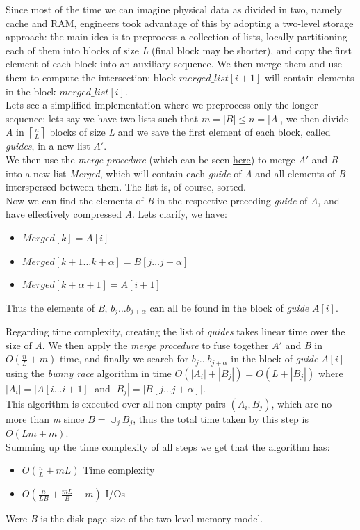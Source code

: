Since most of the time we can imagine physical data as divided in two, namely cache and RAM, engineers took advantage of this by adopting a two-level storage approach: the main idea is to preprocess a collection of lists, locally partitioning each of them into blocks of size \textit{L} (final block may be shorter), and copy the first element of each block into an auxiliary sequence. We then merge them and use them to compute the intersection: block $merged\_list[i+1]$ will contain elements in the block $merged\_list[i]$.\\
Lets see a simplified implementation where we preprocess only the longer sequence: lets say we have two lists such that $m=|B| \leq n=|A|$, we then divide \textit{A} in $\left\lceil \frac{n}{L} \right\rceil$ blocks of size \textit{L} and we save the first element of each block, called \textit{guides}, in a new list $A'$. \\
We then use the \textit{merge procedure} (which can be seen \href{https://en.wikipedia.org/wiki/Merge_algorithm}{here}) to merge $A'$ and \textit{B} into a new list \textit{Merged}, which will contain each \textit{guide} of \textit{A} and all elements of \textit{B} interspersed between them. The list is, of course, sorted.\\
Now we can find the elements of \textit{B} in the respective preceding \textit{guide} of \textit{A}, and have effectively compressed \textit{A}. Lets clarify, we have:

\begin{itemize}
    \item $Merged[k] = A[i]$
    \item $Merged[k+1 \ldots k+\alpha] = B[j \ldots j+\alpha]$
    \item $Merged[k+\alpha +1] = A[i+1]$
\end{itemize}

Thus the elements of \textit{B}, $b_j \ldots b_{j+\alpha}$ can all be found in the block of \textit{guide} $A[i]$.

Regarding time complexity, creating the list of \textit{guides} takes linear time over the size of \textit{A}. We then apply the \textit{merge procedure} to fuse together $A'$ and \textit{B} in $O\left(\frac{n}{L} +m \right)$ time, and finally we search for $b_j \ldots b_{j+\alpha}$ in the block of \textit{guide} $A[i]$ using the \textit{bunny race}  algorithm in time $O\left(|A_i| + |B_j|\right) = O\left(L+|B_j|\right)$ where $|A_i| = \big|A[i \ldots i+1]\big|$ and $|B_j| = \big|B[j \ldots j+\alpha]\big|$.\\
This algorithm is executed over all non-empty pairs $(A_i, B_j)$, which are no more than \textit{m} since $B = \cup_j B_j$, thus the total time taken by this step is $O(Lm+m)$.\\
Summing up the time complexity of all steps we get that the algorithm has:

\begin{itemize}
    \item $O \left( \frac{n}{L} +mL \right)$ Time complexity
    \item $O \left( \frac{n}{LB} + \frac{mL}{B} +m \right)$ I/Os 
\end{itemize}

Were \textit{B} is the disk-page size of the two-level memory model.



